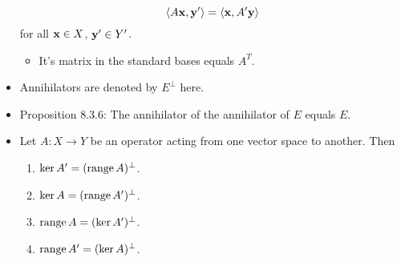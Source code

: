 \documentclass[../../notes.tex]{subfiles}
\begin{document}
\begin{itemize}
    \begin{equation*}
        \langle A\mathbf{x},\mathbf{y}'\rangle = \langle\mathbf{x},A'\mathbf{y}\rangle
    \end{equation*}
    for all $\mathbf{x}\in X$, $\mathbf{y}'\in Y'$.
    \begin{itemize}
        \item It's matrix in the standard bases equals $A^T$.
    \end{itemize}
    \item Annihilators are denoted by $E^\perp$ here.
    \item Proposition 8.3.6: The annihilator of the annihilator of $E$ equals $E$.
    \item Let $A:X\to Y$ be an operator acting from one vector space to another. Then
    \begin{enumerate}
        \item $\ker A'=(\operatorname{range} A)^\perp$.
        \item $\ker A=(\operatorname{range} A')^\perp$.
        \item $\operatorname{range} A = (\ker A')^\perp$.
        \item $\operatorname{range} A'=(\ker A)^\perp$.
    \end{enumerate}
\end{itemize}
\end{document}
